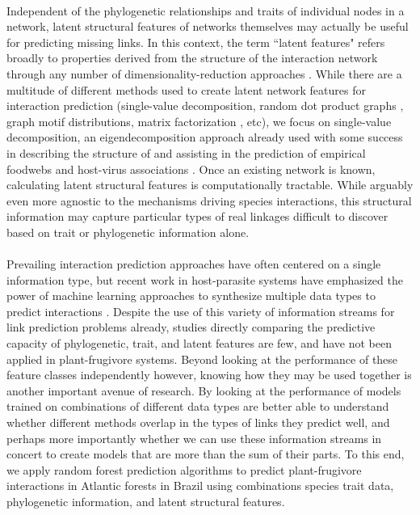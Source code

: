 \documentclass[openacc]{rsproca_new}%
\begin{document}
\paragraph*{}
Independent of the phylogenetic relationships and traits of individual nodes in a network, latent structural features of networks themselves may actually be useful for predicting missing links. In this context, the term ``latent features" refers broadly to properties derived from the structure of the interaction network through any number of dimensionality-reduction approaches \cite{poisot2021imputing}. While there are a multitude of different methods used to create latent network features for interaction prediction (single-value decomposition, random dot product graphs \cite{strydom2022food}, graph motif distributions, matrix factorization \cite{seo2018predicting}, etc), we focus on single-value decomposition, an eigendecomposition approach already used with some success in describing the structure of and assisting in the prediction of empirical foodwebs \cite{banville2023constrains} and host-virus associations \cite{poisot2021imputing, poisot2023network}. Once an existing network is known, calculating latent structural features is computationally tractable. While arguably even more agnostic to the mechanisms driving species interactions, this structural information may capture particular types of real linkages difficult to discover based on trait or phylogenetic information alone. 


\paragraph*{}
Prevailing interaction prediction approaches have often centered on a single information type, but recent work in host-parasite systems have emphasized the power of machine learning approaches to synthesize multiple data types to predict interactions \cite{strydom2021roadmap}. Despite the use of this variety of information streams for link prediction problems already, studies directly comparing the predictive capacity of phylogenetic, trait, and latent features are few, and have not been applied in plant-frugivore systems. Beyond looking at the performance of these feature classes independently however, knowing how they may be used together is another important avenue of research. By looking at the performance of models trained on combinations of different data types are better able to understand whether different methods overlap in the types of links they predict well, and perhaps more importantly whether we can use these information streams in concert to create models that are more than the sum of their parts. To this end, we apply random forest prediction algorithms to predict plant-frugivore interactions in Atlantic forests in Brazil using combinations species trait data, phylogenetic information, and latent structural features. 
\end{document}
